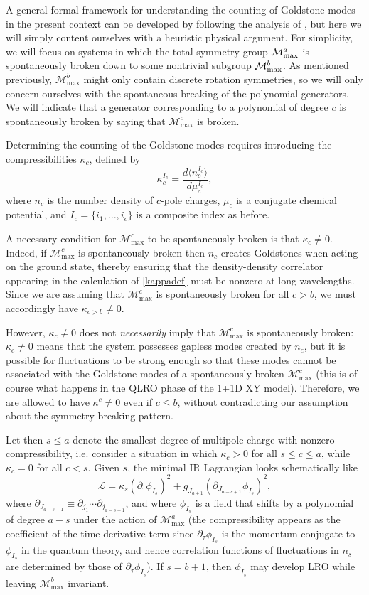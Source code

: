 \documentclass[prb,aps,twocolumn, amsfonts,amsmath,amssymb,nofootinbib,superscriptaddress]{revtex4-2}
\renewcommand{\max}{\text{max}}
\newcommand{\mmax}[1]{\mathcal{M}^{#1}_\max}
\newcommand\be            {\begin{equation}}
\newcommand\ee            {\end{equation}}
\newcommand{\p}{\partial}
\newcommand{\mcm}{\mathcal{M}}
\begin{document}
A general formal framework for understanding the counting of Goldstone modes in the present context can be developed by following the analysis of \cite{watanabe2013redundancies}, but here we will simply content ourselves with a heuristic physical argument. For simplicity, we will focus on systems in which the total symmetry group $\mcm_{\rm max}^a$ is spontaneously broken down to some nontrivial subgroup $\mcm_{\rm max}^b$. As mentioned previously, $\mmax{b}$ might only contain discrete rotation symmetries, so we will only concern ourselves with the spontaneous breaking of the polynomial generators. We will indicate that a generator corresponding to a polynomial of degree $c$ is spontaneously broken by saying that $\mmax{c}$ is broken.

Determining the counting of the Goldstone modes requires introducing the compressibilities $\kappa_c$, defined by 
\be \label{kappadef} \kappa_c^{I_c} = \frac{d\langle n_c^{I_c}\rangle}{d\mu_c^{I_c}},\ee 
where $n_c$ is the number density of $c$-pole charges, $\mu_c$ is a conjugate chemical potential, and $I_c = \{i_1,\dots,i_c\}$ is a composite index as before.

A necessary condition for $\mmax c$ to be spontaneously broken is that $\kappa_c \neq 0$. Indeed, if $\mmax c$ is spontaneously broken then $n_c$ creates Goldstones when acting on the ground state, thereby ensuring that the density-density correlator appearing in the calculation of \eqref{kappadef} must be nonzero at long wavelengths. Since we are assuming that $\mmax c$ is spontaneously broken for all $c>b$, we must accordingly have $\kappa_{c>b} \neq 0$. 

However, $\kappa_c \neq 0$ does not {\it necessarily} imply that $\mmax c$ is spontaneously broken: $\kappa_c\neq 0$ means that the system possesses gapless modes created by $n_c$, but it is possible for fluctuations to be strong enough so that these modes cannot be associated with the Goldstone modes of a spontaneously broken $\mmax c$ (this is of course what happens in the QLRO phase of the 1+1D XY model). Therefore, we are allowed to have $\kappa^c \neq 0$ even if $c \leq b$, without contradicting our assumption about the symmetry breaking pattern. 

Let then $s\leq a$ denote the smallest degree of multipole charge with nonzero compressibility, i.e. consider a situation in which $\kappa_c>0$ for all $s\leq c\leq a$, while $\kappa_c=0$ for all $c<s$. 
Given $s$, the minimal IR Lagrangian looks schematically like 
\be \label{generall} \mathcal{L} = \kappa_s (\partial_\tau \phi_{I_s})^2 + g_{J_{a+1}}(\partial_{J_{a-s+1}}\phi_{I_s})^2,\ee where 
$\p_{J_{a-s+1}} \equiv \p_{j_1} \cdots \p_{j_{a-s+1}}$, and where $\phi_{I_s}$ is a field that shifts by a polynomial of degree $a-s$ under the action of $\mmax a$ (the compressibility appears as the coefficient of the time derivative term since $\p_\tau \phi_{I_s}$ is the momentum conjugate to $\phi_{I_s}$ in the quantum theory, and hence correlation functions of fluctuations in $n_s$ are determined by those of $\p_\tau \phi_{I_s}$).  If $s=b+1$, then $\phi_{I_s}$ may develop LRO while leaving $\mmax{b}$ invariant.
\end{document}
